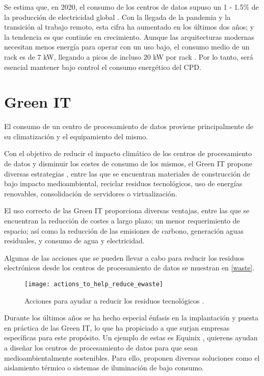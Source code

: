 Se estima que, en 2020, el consumo de los centros de datos supuso un 1 - 1.5\% de la producción de electricidad global \cite{mytton-dc}. Con la llegada de la pandemia y la transición al trabajo remoto, esta cifra ha aumentado en los últimos dos años; y la tendencia es que continúe en crecimiento. Aunque las arquitecturas modernas necesitan menos energía para operar con un uso bajo, el consumo medio de un rack es de 7 kW, llegando a picos de incluso 20 kW por rack \cite{datacenters-density}. Por lo tanto, será esencial mantener bajo control el consumo energético del CPD. 

\section{Green IT}

El consumo de un centro de procesamiento de datos proviene principalmente de su climatización y el equipamiento del mismo.

Con el objetivo de reducir el impacto climático de los centros de procesamiento de datos y disminuir los costes de consumo de los mismos, el Green IT propone diversas estrategias \cite{techtargetgreen}, entre las que se encuentran materiales de construcción de bajo impacto medioambiental, reciclar residuos tecnológicos, uso de energías renovables, consolidación de servidores o virtualización.

El uso correcto de las Green IT proporciona diversas ventajas, entre las que se encuentran la reducción de costes a largo plazo; un menor requerimiento de espacio; así como la reducción de las emisiones de carbono, generación aguas residuales, y consumo de agua y electricidad.

Algunas de las acciones que se pueden llevar a cabo para reducir los residuos electrónicos desde los centros de procesamiento de datos se muestran en \eqref{waste}.

\begin{figure}
    \begin{center}
        \texttt{[image: actions\_to\_help\_reduce\_ewaste]}
        \caption{Acciones para ayudar a reducir los residuos tecnológicos \cite{techtargetgreen}.}
        \label{waste}
    \end{center}
\end{figure}

Durante los últimos años se ha hecho especial énfasis en la implantación y puesta en práctica de las Green IT, lo que ha propiciado a que surjan empresas específicas para este propósito. Un ejemplo de estas es Equinix \cite{equinix}, quierens ayudan a diseñar los centros de procesamiento de datos para que sean medioambientalmente sostenibles. Para ello, proponen diversas soluciones como el aislamiento térmico o sistemas de iluminación de bajo consumo.

